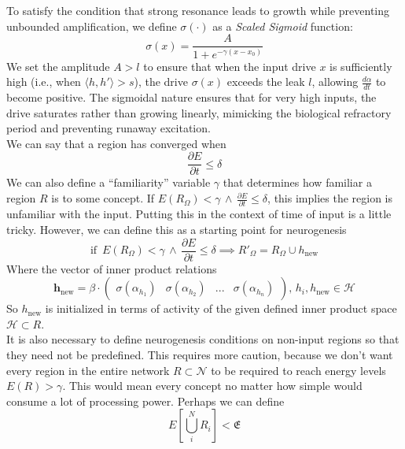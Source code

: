 \documentclass{article}
\begin{document}
To satisfy the condition that strong resonance leads to growth while preventing unbounded amplification, we define $\sigma(\cdot)$ as a \textit{Scaled Sigmoid} function:
\begin{equation}
    \sigma(x) = \frac{A}{1 + e^{-\gamma(x - x_0)}}
\end{equation}
We set the amplitude $A > l$ to ensure that when the input drive $x$ is sufficiently high (i.e., when $\langle h, h' \rangle > s$), the drive $\sigma(x)$ exceeds the leak $l$, allowing $\frac{d\alpha}{dt}$ to become positive. The sigmoidal nature ensures that for very high inputs, the drive saturates rather than growing linearly, mimicking the biological refractory period and preventing runaway excitation. \\

We can say that a region has converged when 
\begin{equation}
    \frac{\partial E}{\partial t} \le \delta
\end{equation}
We can also define a ``familiarity'' variable $\gamma$ that determines how familiar a region $R$ is to some concept. If $E(R_\Omega) < \gamma \, \land  \, \frac{\partial E}{\partial t} \le \delta$, this implies the region is unfamiliar with the input. Putting this in the context of time of input is a little tricky. However, we can define this as a starting point for neurogenesis
\begin{equation}
    \text{if} \, \, \, E(R_\Omega) < \gamma \, \land  \, \frac{\partial E}{\partial t} \le \delta \implies R'_\Omega = R_\Omega \cup h_{\text{new}}
\end{equation}
Where the vector of inner product relations 
\begin{equation}
    \mathbf{h}_{\text{new}} = \beta \cdot \begin{pmatrix}
        \sigma(\alpha_{h_1}) & \sigma(\alpha_{h_2})&... &\sigma(\alpha_{h_n})
    \end{pmatrix}, \, h_i, h_{\text{new}} \in \mathcal{H}
\end{equation}
So $h_{\text{new}}$ is initialized in terms of activity of the given defined inner product space $\mathcal{H} \subset R$. \\

It is also necessary to define neurogenesis conditions on non-input regions so that they need not be predefined. This requires more caution, because we don't want every region in the entire network $R \subset \mathcal{N}$ to be required to reach energy levels $E(R) > \gamma$. This would mean every concept no matter how simple would consume a lot of processing power. Perhaps we can define 
\begin{equation}
    E \left[ \bigcup_i^N R_i \right] < \mathfrak{E}
\end{equation}
\end{document}
